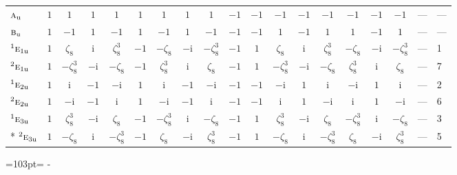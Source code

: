 \documentclass[10pt,a4paper]{article}
\newcommand{\needspace}[1]{\par\penalty-100\begingroup\dimen0=#1\relax\dimen2=\pagegoal
  \advance\dimen2-\pagetotal\ifdim\dimen0>\dimen2\relax\ifdim\dimen2>0pt\vfil\break\fi\fi
  \endgroup}
\numberwithin{equation}{section}
\newcommand{\irr}[1]{\text{\normalfont\scshape #1}}
\newcommand{\conjpair}[1]{{}^{#1}}
\newcommand{\ptag}[1]{\mathrm{#1}}
\newcommand{\iunit}{\mathrm{i}}
\newcommand{\rootunity}[1]{\zeta_{#1}}
\begin{document}
{\begin{longtable}{@{}lccccccccccccccccll@{}}
$\irr{a}_{\ptag{u}}$ & $1$ & $1$ & $1$ & $1$ & $1$ & $1$ & $1$ & $1$ & $-1$ & $-1$ & $-1$ & $-1$ & $-1$ & $-1$ & $-1$ & $-1$ & --- & ---\\
$\irr{b}_{\ptag{u}}$ & $1$ & $-1$ & $1$ & $-1$ & $1$ & $-1$ & $1$ & $-1$ & $-1$ & $-1$ & $1$ & $-1$ & $1$ & $1$ & $-1$ & $1$ & --- & ---\\
$\conjpair{1}\irr{e}_{1\ptag{u}}$ & $1$ & $\rootunity{8}$ & $\iunit{}$ & $\rootunity{8}^{3}$ & $-1$ & $-\rootunity{8}$ & $-\iunit{}$ & $-\rootunity{8}^{3}$ & $-1$ & $1$ & $\rootunity{8}$ & $\iunit{}$ & $\rootunity{8}^{3}$ & $-\rootunity{8}$ & $-\iunit{}$ & $-\rootunity{8}^{3}$ & --- & 1\\
$\conjpair{2}\irr{e}_{1\ptag{u}}$ & $1$ & $-\rootunity{8}^{3}$ & $-\iunit{}$ & $-\rootunity{8}$ & $-1$ & $\rootunity{8}^{3}$ & $\iunit{}$ & $\rootunity{8}$ & $-1$ & $1$ & $-\rootunity{8}^{3}$ & $-\iunit{}$ & $-\rootunity{8}$ & $\rootunity{8}^{3}$ & $\iunit{}$ & $\rootunity{8}$ & --- & 7\\
$\conjpair{1}\irr{e}_{2\ptag{u}}$ & $1$ & $\iunit{}$ & $-1$ & $-\iunit{}$ & $1$ & $\iunit{}$ & $-1$ & $-\iunit{}$ & $-1$ & $-1$ & $-\iunit{}$ & $1$ & $\iunit{}$ & $-\iunit{}$ & $1$ & $\iunit{}$ & --- & 2\\
$\conjpair{2}\irr{e}_{2\ptag{u}}$ & $1$ & $-\iunit{}$ & $-1$ & $\iunit{}$ & $1$ & $-\iunit{}$ & $-1$ & $\iunit{}$ & $-1$ & $-1$ & $\iunit{}$ & $1$ & $-\iunit{}$ & $\iunit{}$ & $1$ & $-\iunit{}$ & --- & 6\\
$\conjpair{1}\irr{e}_{3\ptag{u}}$ & $1$ & $\rootunity{8}^{3}$ & $-\iunit{}$ & $\rootunity{8}$ & $-1$ & $-\rootunity{8}^{3}$ & $\iunit{}$ & $-\rootunity{8}$ & $-1$ & $1$ & $\rootunity{8}^{3}$ & $-\iunit{}$ & $\rootunity{8}$ & $-\rootunity{8}^{3}$ & $\iunit{}$ & $-\rootunity{8}$ & --- & 3\\*
$\conjpair{2}\irr{e}_{3\ptag{u}}$ & $1$ & $-\rootunity{8}$ & $\iunit{}$ & $-\rootunity{8}^{3}$ & $-1$ & $\rootunity{8}$ & $-\iunit{}$ & $\rootunity{8}^{3}$ & $-1$ & $1$ & $-\rootunity{8}$ & $\iunit{}$ & $-\rootunity{8}^{3}$ & $\rootunity{8}$ & $-\iunit{}$ & $\rootunity{8}^{3}$ & --- & 5\\
\bottomrule\end{longtable}}
\needspace{103pt}
\end{document}

